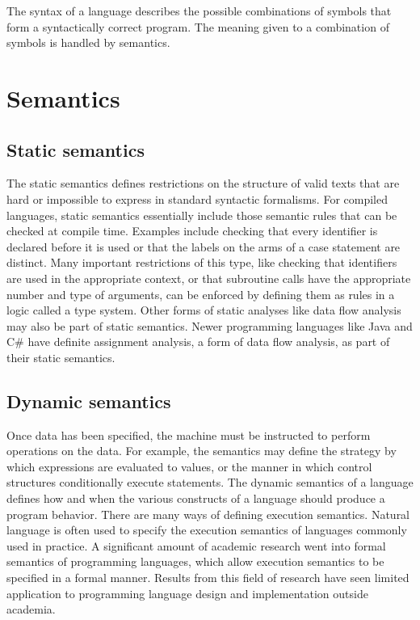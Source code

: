 The syntax of a language describes the possible combinations of symbols
that form a syntactically correct program. The meaning given to a
combination of symbols is handled by semantics.

\section{Semantics}
\vspace{-1em}
\subsection{Static semantics}
The static semantics defines restrictions on the structure of valid texts
that are hard or impossible to express in standard syntactic formalisms.
For compiled languages, static semantics essentially include those semantic
rules that can be checked at compile time. Examples include checking that
every identifier is declared before it is used or that the labels on the
arms of a case statement are distinct. Many important restrictions of this
type, like checking that identifiers are used in the appropriate context,
or that subroutine calls have the appropriate number and type of arguments,
can be enforced by defining them as rules in a logic called a type system.
Other forms of static analyses like data flow analysis may also be part of
static semantics. Newer programming languages like Java and C\# have
definite assignment analysis, a form of data flow analysis, as part of their
static semantics.

\subsection{Dynamic semantics}
Once data has been specified, the machine must be instructed to perform
operat\-ions on the data. For example, the semantics may define the strategy
by which expressions are evaluated to values, or the manner in which
control structures conditionally execute statements. The dynamic semantics
of a language defines how and when the various constructs of a language
should produce a program behavior. There are many ways of defining execution
semantics. Natural language is often used to specify the execution semantics
of languages commonly used in practice. A significant amount of academic
research went into formal semantics of programming languages, which allow
execution semantics to be specified in a formal manner. Results from this
field of research have seen limited application to programming language
design and implementation outside academia.

